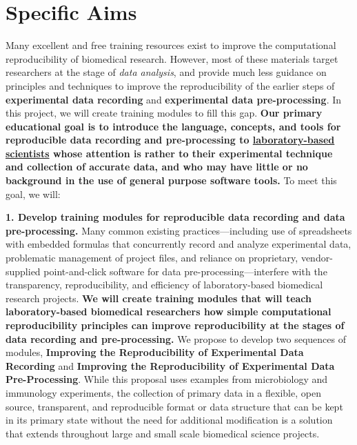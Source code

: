 \documentclass[pdftex,english,11.5pt,parskip=half]{scrartcl}
\begin{document}
\def\bf{\normalfont\bfseries}
\pagestyle{empty}

\section*{Specific Aims}
\begingroup
    \fontsize{11pt}{12pt}\selectfont 
    
Many excellent and free training resources exist to improve the computational reproducibility of biomedical research. However, most of these materials target researchers at the stage of \textit{data analysis}, and provide much less guidance on principles and techniques to improve the 
reproducibility of the earlier steps of \textbf{experimental data recording} and \textbf{experimental data pre-processing}. In this project, we will create training modules to fill this gap. \textbf{Our primary educational goal is to introduce the language, concepts, and tools for reproducible data recording and pre-processing to \underline{laboratory-based scientists} whose attention is rather to 
their experimental technique and collection of accurate data, and who may have little or no background 
in the use of general purpose software tools.} To meet this goal, we will:

\textbf{1. Develop training modules for reproducible data recording and data pre-processing.} 
Many common existing practices---including use of spreadsheets with embedded formulas that 
concurrently record and analyze experimental data, problematic management of project files,
and reliance on proprietary, vendor-supplied point-and-click software for data
pre-processing---interfere with the transparency, reproducibility, and
efficiency of laboratory-based biomedical research projects. \textbf{We will create training modules that will teach laboratory-based biomedical
researchers how simple computational reproducibility principles can improve
reproducibility at the stages of data recording and
pre-processing.} We propose to develop two sequences of modules, \textbf{Improving the
Reproducibility of Experimental Data Recording} and \textbf{Improving the
Reproducibility of Experimental Data Pre-Processing}. 
While this proposal uses examples from microbiology 
and immunology experiments, the collection of primary data in a flexible, open source, 
transparent, and reproducible format or data structure that can be kept in its primary state 
without the need for additional modification is a solution that extends throughout large and 
small scale biomedical science projects.
\end{document}

